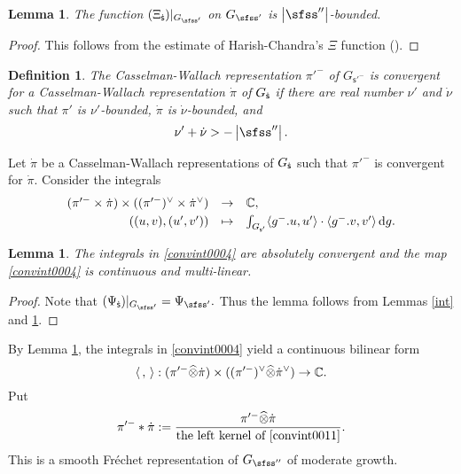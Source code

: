 \documentclass[12pt,a4paper]{amsart}
\def\abs#1{\left|{#1}\right|}
\newcommand{\od}{\operatorname{d}}
\newcommand{\la}{\langle}
\newcommand{\ra}{\rangle}
\newcommand{\be}{\begin {equation}}
\newcommand{\ee}{\end {equation}}
\numberwithin{equation}{section}
\newtheorem{lem}[thm]{Lemma}
\newtheorem{defn}[thm]{Definition}
\theoremstyle{remark}
\begin{document}
\begin{lem}\label{boundxx}
The function $(\Xi_\dsfss)|_{G_{\sfss'}}$ on $G_{\sfss'}$  is   $\abs{\sfss''}$-bounded.  
\end{lem}
\begin{proof}
This follows from the  estimate of Harish-Chandra's $\Xi$ function (\cite[Theorem 4.5.3]{Wa1}).
\end{proof}


 \begin{defn}\label{defn:CR33}
The Casselman-Wallach representation  $\pi'^-$ of $G_{\mathsf s'^-}$ is convergent  for a   Casselman-Wallach representation  $\dot \pi$ of $G_{{\dot{\mathsf s}}}$ if there are real number $\nu'$ and $\dot \nu$ such that $\pi'$ is $\nu'$-bounded, $\dot \pi$ is $\dot \nu$-bounded, and
\[
  \nu'+\dot \nu>-\abs{\sfss''}. 
\]
\end{defn}

Let $\dot \pi$  be a Casselman-Wallach representations of $G_{{\dot{\mathsf s}}}$ such that $\pi'^-$  is convergent  for  $\dot \pi$. 
Consider the integrals
\be\label{convint0004}
\begin{array}{rcl}
 (\pi'^- \times \dot \pi)\times ((\pi'^-)^\vee \times \dot \pi^\vee )&\rightarrow &\C, \smallskip \\
   ((u,v),(u',v')) &\mapsto &\int_{G_{\mathsf s'}} \la g^-.u, u'\ra\cdot \la g^-.v, v'\ra \od\! g.
   \end{array}
 \ee

\begin{lem}\label{intpi0004}
The integrals in \eqref{convint0004} are absolutely convergent and the map \eqref{convint0004} is   continuous and multi-linear. 
\end{lem}
\begin{proof}
Note that 
$
  (\Psi_{\dsfss})|_{G_{\sfss'}}=\Psi_{\sfss'}.
$
Thus the lemma follows from Lemmas \ref{int} and \ref{boundxx}.
\end{proof}



By Lemma \ref{intpi0004}, the integrals in \eqref{convint0004} yield a continuous bilinear form
\be\label{convint0011}
 \la\,,\,\ra: (\pi'^- \widehat \otimes{ \dot \pi})\times ((\pi'^-)^\vee \widehat \otimes {\dot \pi}^\vee )\rightarrow \C.
 \ee
Put
\begin{equation}\label{thetab0}
 \pi'^-*\dot \pi:=\frac{\pi'^-\widehat \otimes \dot \pi}{\textrm{the left kernel of \eqref{convint0011}}}.
\end{equation}
This is a smooth Fr\'echet representation of $G_{\sfss''}$ of moderate growth. 
\end{document}
